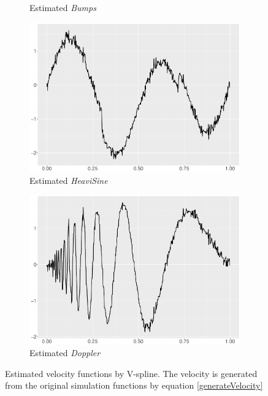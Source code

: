 \begin{figure}
\begin{subfigure}{0.45\textwidth}
    \caption{Estimated \textit{Bumps}  }
    \end{subfigure}
    \begin{subfigure}{0.45\textwidth}
    \centering
    \includegraphics[width=\textwidth]{Chapters/02TractorSplineTheory/plot/ggplot/ggHeaviSineTractorVelocity.pdf}
    \caption{Estimated \textit{HeaviSine}  }
    \end{subfigure}
    \begin{subfigure}{0.45\textwidth}
    \centering
    \includegraphics[width=\textwidth]{Chapters/02TractorSplineTheory/plot/ggplot/ggDopplerTractorVelocity.pdf}
    \caption{Estimated \textit{Doppler}  }
    \end{subfigure}
\caption{Estimated velocity functions by V-spline. The velocity is generated from the original simulation functions by equation \eqref{generateVelocity}}\label{numvtractor}
 \end{figure}



